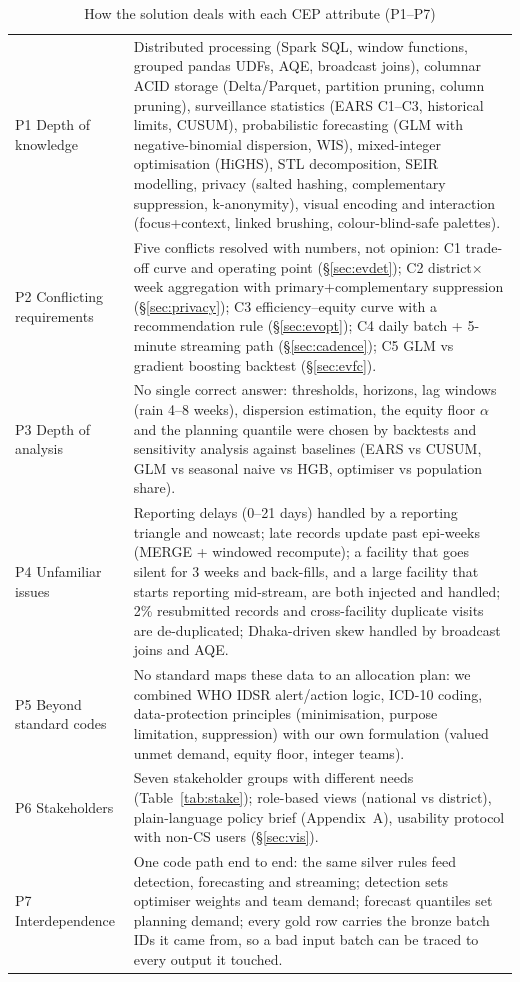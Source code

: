 \documentclass[conference]{IEEEtran}
\begin{document}
\begin{table}[t]\centering\footnotesize
\caption{How the solution deals with each CEP attribute (P1--P7)}\label{tab:cep}
\begin{tabular}{@{}p{2.3cm}p{14.6cm}@{}}\toprule
P1 Depth of knowledge & Distributed processing (Spark SQL, window functions, grouped pandas UDFs, AQE, broadcast joins), columnar ACID storage (Delta/Parquet, partition pruning, column pruning), surveillance statistics (EARS C1--C3, historical limits, CUSUM), probabilistic forecasting (GLM with negative-binomial dispersion, WIS), mixed-integer optimisation (HiGHS), STL decomposition, SEIR modelling, privacy (salted hashing, complementary suppression, k-anonymity), visual encoding and interaction (focus+context, linked brushing, colour-blind-safe palettes).\\
P2 Conflicting requirements & Five conflicts resolved with numbers, not opinion: C1 trade-off curve and operating point (\S\ref{sec:evdet}); C2 district$\times$week aggregation with primary+complementary suppression (\S\ref{sec:privacy}); C3 efficiency--equity curve with a recommendation rule (\S\ref{sec:evopt}); C4 daily batch + 5-minute streaming path (\S\ref{sec:cadence}); C5 GLM vs gradient boosting backtest (\S\ref{sec:evfc}).\\
P3 Depth of analysis & No single correct answer: thresholds, horizons, lag windows (rain 4--8 weeks), dispersion estimation, the equity floor $\alpha$ and the planning quantile were chosen by backtests and sensitivity analysis against baselines (EARS vs CUSUM, GLM vs seasonal naive vs HGB, optimiser vs population share).\\
P4 Unfamiliar issues & Reporting delays (0--21 days) handled by a reporting triangle and nowcast; late records update past epi-weeks (MERGE + windowed recompute); a facility that goes silent for 3 weeks and back-fills, and a large facility that starts reporting mid-stream, are both injected and handled; 2\% resubmitted records and cross-facility duplicate visits are de-duplicated; Dhaka-driven skew handled by broadcast joins and AQE.\\
P5 Beyond standard codes & No standard maps these data to an allocation plan: we combined WHO IDSR alert/action logic, ICD-10 coding, data-protection principles (minimisation, purpose limitation, suppression) with our own formulation (valued unmet demand, equity floor, integer teams).\\
P6 Stakeholders & Seven stakeholder groups with different needs (Table~\ref{tab:stake}); role-based views (national vs district), plain-language policy brief (Appendix~A), usability protocol with non-CS users (\S\ref{sec:vis}).\\
P7 Interdependence & One code path end to end: the same silver rules feed detection, forecasting and streaming; detection sets optimiser weights and team demand; forecast quantiles set planning demand; every gold row carries the bronze batch IDs it came from, so a bad input batch can be traced to every output it touched.\\\bottomrule
\end{tabular}\end{table}
\end{document}
